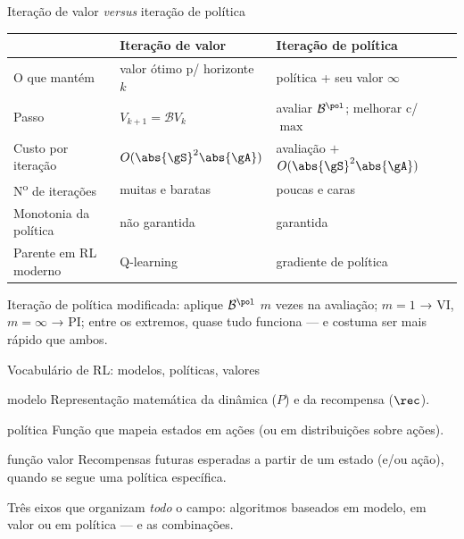 \documentclass[aspectratio=169, 11pt]{beamer}
\newcommand{\Bop}{\mathcal{B}}                 %
\newcommand{\Bpol}{\mathcal{B}^{\pol}}         %
\begin{document}
\begin{frame}{Iteração de valor \emph{versus} iteração de política}
  \vspace{-0.3em}
  \begin{center}
  {\small
  \begin{tabular}{@{}p{3.4cm}p{4.6cm}p{4.6cm}@{}}
    \toprule
     & \textbf{Iteração de valor} & \textbf{Iteração de política} \\
    \midrule
    O que mantém & valor ótimo p/ horizonte $k$ & política + seu valor $\infty$ \\
    Passo & $V_{k+1} = \Bop V_k$ & avaliar $\Bpol$; melhorar c/ $\max$ \\
    Custo por iteração & $O(\abs{\gS}^2 \abs{\gA})$ & avaliação $+$ $O(\abs{\gS}^2 \abs{\gA})$ \\
    N\textsuperscript{o} de iterações & muitas e baratas & poucas e caras \\
    Monotonia da política & não garantida & \alert{garantida} \\
    Parente em RL moderno & Q-learning & gradiente de política \\
    \bottomrule
  \end{tabular}}
  \end{center}
  \vspace{-0.1em}
  \begin{ideiabox}
    \alert{Iteração de política modificada}: aplique $\Bpol$ $m$ vezes na avaliação;
    $m=1$ → VI, $m=\infty$ → PI; entre os extremos, quase tudo funciona --- e costuma
    ser mais rápido que ambos.
  \end{ideiabox}
\end{frame}

\begin{frame}{Vocabulário de RL: modelos, políticas, valores}
  \begin{defbox}{modelo}
    Representação matemática da dinâmica ($P$) e da recompensa ($\rec$).
  \end{defbox}
  \begin{defbox}{política}
    Função que mapeia estados em ações (ou em distribuições sobre ações).
  \end{defbox}
  \begin{defbox}{função valor}
    Recompensas futuras esperadas a partir de um estado (e/ou ação), quando se segue uma
    política específica.
  \end{defbox}
  \vspace{-0.7em}
  \begin{ideiabox}
    Três eixos que organizam \emph{todo} o campo: algoritmos baseados em modelo, em
    valor ou em política --- e as combinações.
  \end{ideiabox}
\end{frame}
\end{document}
